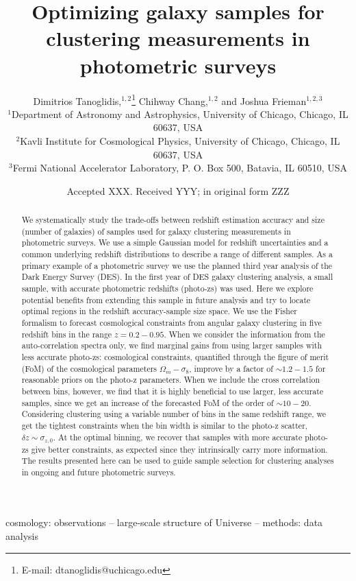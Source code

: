 \documentclass[a4paper,fleqn,usenatbib]{mnras}
\title[Galaxy samples in photo-z surveys]{Optimizing galaxy samples for clustering measurements in photometric surveys}
\author[D. Tanoglidis et al.]{
Dimitrios Tanoglidis,$^{1,2}$\thanks{E-mail: dtanoglidis@uchicago.edu}
Chihway Chang,$^{1,2}$
and Joshua Frieman$^{1,2,3}$
\\
$^{1}$Department of Astronomy and Astrophysics, University of Chicago, Chicago, IL 60637, USA \\
$^{2}$Kavli Institute for Cosmological Physics, University of Chicago, Chicago, IL 60637, USA\\
$^{3}$Fermi National Accelerator Laboratory, P. O. Box 500, Batavia, IL 60510, USA
}
\date{Accepted XXX. Received YYY; in original form ZZZ}
\begin{document}
\label{firstpage}
\pagerange{\pageref{firstpage}--\pageref{lastpage}}
\maketitle

\begin{abstract}
We systematically study the trade-offs between redshift estimation accuracy and size (number of galaxies) of samples used for galaxy clustering measurements in photometric surveys. We use a simple Gaussian model for redshift uncertainties and a common underlying redshift distributions to describe a range of different samples. As a primary example of a photometric survey we use the planned third year analysis of the Dark Energy Survey (DES). In the first year of DES  galaxy clustering analysis, a small sample, with accurate photometric redshifts (photo-zs) was used. Here we explore potential benefits from extending this sample in future analysis and try to locate optimal regions in the redshift accuracy-sample size space. We use the Fisher formalism to forecast cosmological constraints from angular galaxy clustering in five redshift bins in the range $z = 0.2 - 0.95$. When we consider the information from the auto-correlation spectra only, we find marginal gains from using larger samples with less accurate photo-zs: cosmological constraints, quantified through the figure of merit (FoM) of the cosmological parameters $\Omega_m - \sigma_8$, improve by a factor of $\sim 1.2  - 1.5$ for reasonable priors on the photo-z parameters. When we include the cross correlation between bins, however, we find that it is highly beneficial to use larger, less accurate samples, since we get an increase of the forecasted FoM of the order of $\sim 10-20$. Considering clustering using a variable number of bins in the same redshift range, we get the tightest constraints when the bin width is similar to the photo-z scatter, $\delta z \sim \sigma_{z,0}$. At the optimal binning, we recover that samples with more accurate photo-zs give better constraints, as expected since they intrinsically carry more information. The results presented here can be used to guide sample selection for clustering analyses in ongoing and future photometric surveys.
\end{abstract}

\begin{keywords}
cosmology: observations -- large-scale structure of Universe -- methods: data analysis
\end{keywords}
\end{document}
